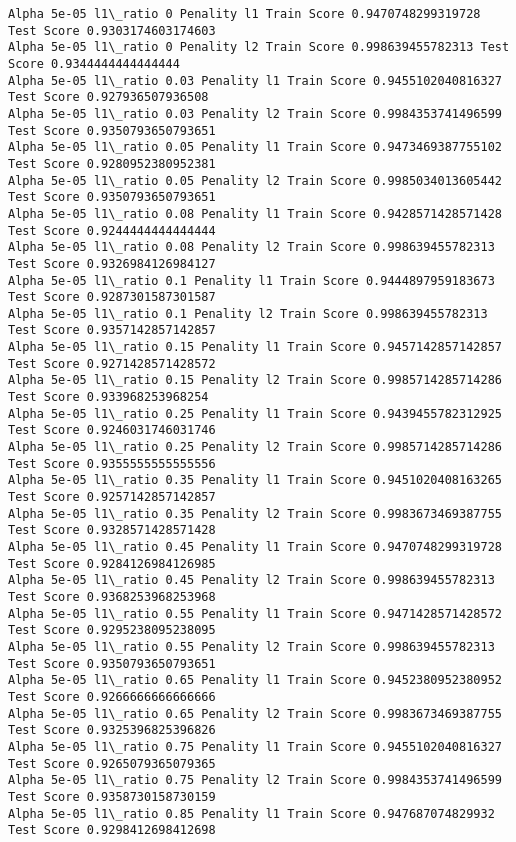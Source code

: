 \documentclass[11pt]{article}
\begin{document}
    \begin{Verbatim}[commandchars=\\\{\}]
Alpha 5e-05 l1\_ratio 0 Penality l1 Train Score 0.9470748299319728 Test Score 0.9303174603174603
Alpha 5e-05 l1\_ratio 0 Penality l2 Train Score 0.998639455782313 Test Score 0.9344444444444444
Alpha 5e-05 l1\_ratio 0.03 Penality l1 Train Score 0.9455102040816327 Test Score 0.927936507936508
Alpha 5e-05 l1\_ratio 0.03 Penality l2 Train Score 0.9984353741496599 Test Score 0.9350793650793651
Alpha 5e-05 l1\_ratio 0.05 Penality l1 Train Score 0.9473469387755102 Test Score 0.9280952380952381
Alpha 5e-05 l1\_ratio 0.05 Penality l2 Train Score 0.9985034013605442 Test Score 0.9350793650793651
Alpha 5e-05 l1\_ratio 0.08 Penality l1 Train Score 0.9428571428571428 Test Score 0.9244444444444444
Alpha 5e-05 l1\_ratio 0.08 Penality l2 Train Score 0.998639455782313 Test Score 0.9326984126984127
Alpha 5e-05 l1\_ratio 0.1 Penality l1 Train Score 0.9444897959183673 Test Score 0.9287301587301587
Alpha 5e-05 l1\_ratio 0.1 Penality l2 Train Score 0.998639455782313 Test Score 0.9357142857142857
Alpha 5e-05 l1\_ratio 0.15 Penality l1 Train Score 0.9457142857142857 Test Score 0.9271428571428572
Alpha 5e-05 l1\_ratio 0.15 Penality l2 Train Score 0.9985714285714286 Test Score 0.933968253968254
Alpha 5e-05 l1\_ratio 0.25 Penality l1 Train Score 0.9439455782312925 Test Score 0.9246031746031746
Alpha 5e-05 l1\_ratio 0.25 Penality l2 Train Score 0.9985714285714286 Test Score 0.9355555555555556
Alpha 5e-05 l1\_ratio 0.35 Penality l1 Train Score 0.9451020408163265 Test Score 0.9257142857142857
Alpha 5e-05 l1\_ratio 0.35 Penality l2 Train Score 0.9983673469387755 Test Score 0.9328571428571428
Alpha 5e-05 l1\_ratio 0.45 Penality l1 Train Score 0.9470748299319728 Test Score 0.9284126984126985
Alpha 5e-05 l1\_ratio 0.45 Penality l2 Train Score 0.998639455782313 Test Score 0.9368253968253968
Alpha 5e-05 l1\_ratio 0.55 Penality l1 Train Score 0.9471428571428572 Test Score 0.9295238095238095
Alpha 5e-05 l1\_ratio 0.55 Penality l2 Train Score 0.998639455782313 Test Score 0.9350793650793651
Alpha 5e-05 l1\_ratio 0.65 Penality l1 Train Score 0.9452380952380952 Test Score 0.9266666666666666
Alpha 5e-05 l1\_ratio 0.65 Penality l2 Train Score 0.9983673469387755 Test Score 0.9325396825396826
Alpha 5e-05 l1\_ratio 0.75 Penality l1 Train Score 0.9455102040816327 Test Score 0.9265079365079365
Alpha 5e-05 l1\_ratio 0.75 Penality l2 Train Score 0.9984353741496599 Test Score 0.9358730158730159
Alpha 5e-05 l1\_ratio 0.85 Penality l1 Train Score 0.947687074829932 Test Score 0.9298412698412698

\end{Verbatim}
\end{document}
